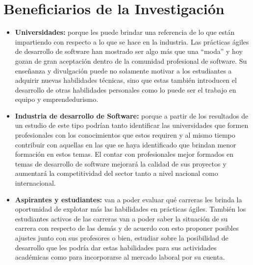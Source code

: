 \section{Beneficiarios de la Investigación}
\begin{itemize}
    \item \textbf{Universidades:} porque les puede brindar una referencia de lo que están impartiendo con respecto a lo que se hace en la industria. Las prácticas ágiles de desarrollo de software han mostrado ser algo más que una ``moda'' y hoy gozan de gran aceptación dentro de la comunidad profesional de software. Su enseñanza y divulgación puede no solamente motivar a los estudiantes a adquirir nuevas habilidades técnicas, sino que estas también introducen el desarrollo de otras habilidades personales como lo puede ser el trabajo en equipo y emprendedurismo.
    \item \textbf{Industria de desarrollo de Software:} porque a partir de los resultados de un estudio de este tipo podrían tanto identificar las universidades que formen profesionales con los conocimientos que estos requiren y al mismo tiempo contribuir con aquellas en las que se haya identificado que brindan menor formación en estos temas. El contar con profesionales mejor formados en temas de desarrollo de software mejorará la calidad de sus proyectos y aumentará la competitividad del sector tanto a nivel nacional como internacional.
    \item \textbf{Aspirantes y estudiantes:} van a poder evaluar qué carreras les brinda la oportunidad de explotar más las habilidades en prácticas ágiles. También los estudiantes activos de las carreras van a poder saber la situación de su carrera con respecto de las demás y de acuerdo con esto proponer posibles ajustes junto con sus profesores o bien, estudiar sobre la posibilidad de desarrollo que les podría dar estas habilidades para sus actividades académicas como para incorporarse al mercado laboral por su cuenta. 
\end{itemize}


